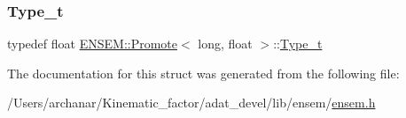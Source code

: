 \subsubsection{\texorpdfstring{Type\_t}{Type\_t}\hspace{0.1cm}{\footnotesize\ttfamily [2/2]}}
{\footnotesize\ttfamily typedef float \mbox{\hyperlink{structENSEM_1_1Promote}{E\+N\+S\+E\+M\+::\+Promote}}$<$ long, float $>$\+::\mbox{\hyperlink{structENSEM_1_1Promote_3_01long_00_01float_01_4_a465824ec9d8cc7704bf91ba4cdeafaad}{Type\+\_\+t}}}



The documentation for this struct was generated from the following file\+:\begin{DoxyCompactItemize}
\item 
/\+Users/archanar/\+Kinematic\+\_\+factor/adat\+\_\+devel/lib/ensem/\mbox{\hyperlink{lib_2ensem_2ensem_8h}{ensem.\+h}}\end{DoxyCompactItemize}
